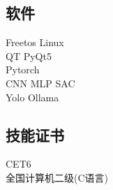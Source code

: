\documentclass[]{deedy-resume-openfont}
\begin{document}
\begin{minipage}[t]{0.25\textwidth}
\subsection{软件}
Freetos \textbullet{} Linux\\
QT \textbullet{} PyQt5 \\
Pytorch \\
CNN \textbullet{} MLP \textbullet{} SAC\\
Yolo \textbullet{} Ollama \\
\sectionsep

\subsection{技能证书}
CET6 \\
全国计算机二级(C语言) \\
\sectionsep


%
%

\end{minipage} 
\hfill
\end{document}
